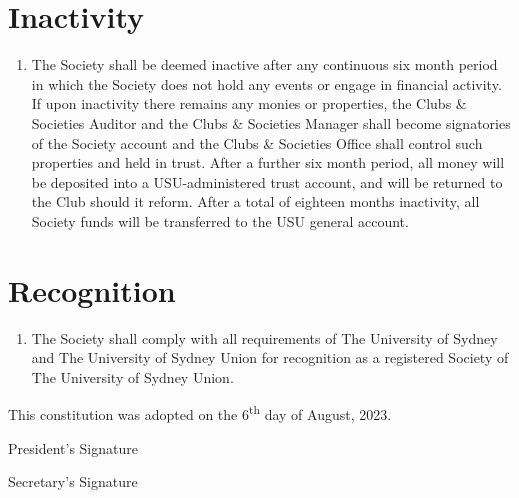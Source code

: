 \documentclass[11pt]{article}
\begin{document}
\section{Inactivity}
\begin{enumerate}[\thesection .1]
    \item The Society shall be deemed inactive after any continuous six month period in which the Society does not hold any events or engage in financial activity.  If upon inactivity there remains any monies or properties, the Clubs \& Societies Auditor and the Clubs \& Societies Manager shall become signatories of the Society account and the Clubs \& Societies Office shall control such properties and held in trust.  After a further six month period, all money will be deposited into a USU-administered trust account, and will be returned to the Club should it reform. After a total of eighteen months inactivity, all Society funds will be transferred to the USU general account.
\end{enumerate}


\section{Recognition}
\begin{enumerate}[\thesection .1]
    \item The Society shall comply with all requirements of The University of Sydney and The University of Sydney Union for recognition as a registered Society of The University of Sydney Union.
\end{enumerate}

\vspace{20mm}

This constitution was adopted on the 6\textsuperscript{th} day of August, 2023. %

\vspace{20mm}
President's Signature \underline{\hspace{6cm}}

\vspace{20mm}
Secretary's Signature \underline{\hspace{6cm}}
\end{document}
